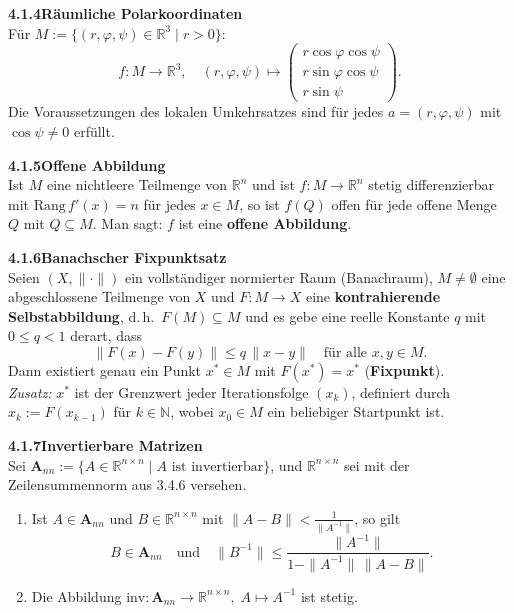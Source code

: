 \documentclass[a4paper,12pt]{article}
\newcommand{\gentry}[3]{%
  \noindent\textbf{#1\quad #2}\nopagebreak\\[0.2em]
  #3\par\smallskip
}
\begin{document}
\gentry{4.1.4}{Räumliche Polarkoordinaten}{%
  Für $M := \{(r, \varphi, \psi) \in \mathbb{R}^3 \mid r > 0\}$:
  \[
    f: M \to \mathbb{R}^3, \quad (r, \varphi, \psi) \mapsto
    \begin{pmatrix} r\cos\varphi\cos\psi \\ r\sin\varphi\cos\psi \\ r\sin\psi \end{pmatrix}.
  \]
  Die Voraussetzungen des lokalen Umkehrsatzes sind für jedes $a = (r, \varphi, \psi)$ mit
  $\cos\psi \neq 0$ erfüllt.
}

\gentry{4.1.5}{Offene Abbildung}{%
  Ist $M$ eine nichtleere Teilmenge von $\mathbb{R}^n$ und ist $f: M \to \mathbb{R}^n$ stetig
  differenzierbar mit $\mathrm{Rang}\,f'(x) = n$ für jedes $x \in M$, so ist $f(Q)$ offen für jede
  offene Menge $Q$ mit $Q \subseteq M$. Man sagt: $f$ ist eine \textbf{offene Abbildung}.
}

\gentry{4.1.6}{Banachscher Fixpunktsatz}{%
  Seien $(X, \|\cdot\|)$ ein vollständiger normierter Raum (Banachraum),
  $M \neq \emptyset$ eine abgeschlossene Teilmenge von $X$ und $F: M \to X$ eine
  \textbf{kontrahierende Selbstabbildung}, d.\,h.\ $F(M) \subseteq M$ und es gebe
  eine reelle Konstante $q$ mit $0 \leq q < 1$ derart, dass
  \[
    \|F(x) - F(y)\| \leq q\,\|x - y\| \quad \text{für alle } x, y \in M.
  \]
  Dann existiert genau ein Punkt $x^* \in M$ mit $F(x^*) = x^*$ (\textbf{Fixpunkt}).\\
  \emph{Zusatz:} $x^*$ ist der Grenzwert jeder Iterationsfolge $(x_k)$, definiert durch
  $x_k := F(x_{k-1})$ für $k \in \mathbb{N}$, wobei $x_0 \in M$ ein beliebiger Startpunkt ist.
}

\gentry{4.1.7}{Invertierbare Matrizen}{%
  Sei $\mathbf{A}_{nn} := \{A \in \mathbb{R}^{n \times n} \mid A \text{ ist invertierbar}\}$,
  und $\mathbb{R}^{n \times n}$ sei mit der Zeilensummennorm aus 3.4.6 versehen.
  \begin{enumerate}[label=(\roman*),topsep=2pt,itemsep=1pt]
    \item Ist $A \in \mathbf{A}_{nn}$ und $B \in \mathbb{R}^{n \times n}$ mit
          $\|A - B\| < \frac{1}{\|A^{-1}\|}$, so gilt
          \[
            B \in \mathbf{A}_{nn} \quad \text{und} \quad
            \|B^{-1}\| \leq \frac{\|A^{-1}\|}{1 - \|A^{-1}\|\,\|A - B\|}.
          \]
    \item Die Abbildung $\mathrm{inv}: \mathbf{A}_{nn} \to \mathbb{R}^{n \times n},\; A \mapsto A^{-1}$ ist stetig.
  \end{enumerate}
}
\end{document}
